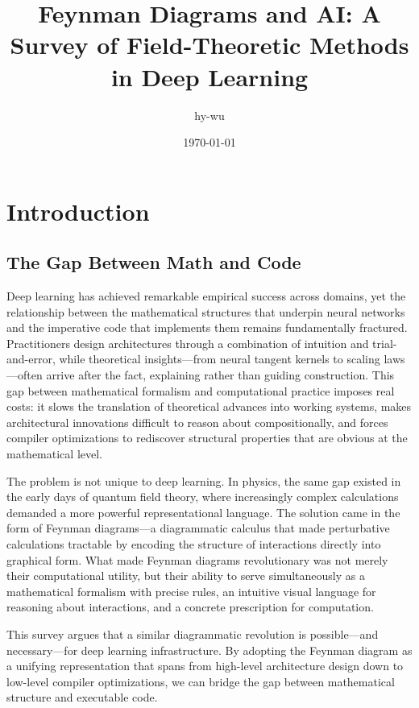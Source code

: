 \documentclass[12pt,a4paper]{article}
\title{Feynman Diagrams and AI: A Survey of Field-Theoretic Methods in Deep Learning}
\author{hy-wu}
\date{\today}
\begin{document}
\maketitle

\section{Introduction}
\subsection{The Gap Between Math and Code}

Deep learning has achieved remarkable empirical success across domains, yet the relationship between the mathematical structures that underpin neural networks and the imperative code that implements them remains fundamentally fractured. Practitioners design architectures through a combination of intuition and trial-and-error, while theoretical insights---from neural tangent kernels to scaling laws---often arrive after the fact, explaining rather than guiding construction. This gap between mathematical formalism and computational practice imposes real costs: it slows the translation of theoretical advances into working systems, makes architectural innovations difficult to reason about compositionally, and forces compiler optimizations to rediscover structural properties that are obvious at the mathematical level.

The problem is not unique to deep learning. In physics, the same gap existed in the early days of quantum field theory, where increasingly complex calculations demanded a more powerful representational language. The solution came in the form of Feynman diagrams---a diagrammatic calculus that made perturbative calculations tractable by encoding the structure of interactions directly into graphical form. What made Feynman diagrams revolutionary was not merely their computational utility, but their ability to serve simultaneously as a mathematical formalism with precise rules, an intuitive visual language for reasoning about interactions, and a concrete prescription for computation.

This survey argues that a similar diagrammatic revolution is possible---and necessary---for deep learning infrastructure. By adopting the Feynman diagram as a unifying representation that spans from high-level architecture design down to low-level compiler optimizations, we can bridge the gap between mathematical structure and executable code.
\end{document}

